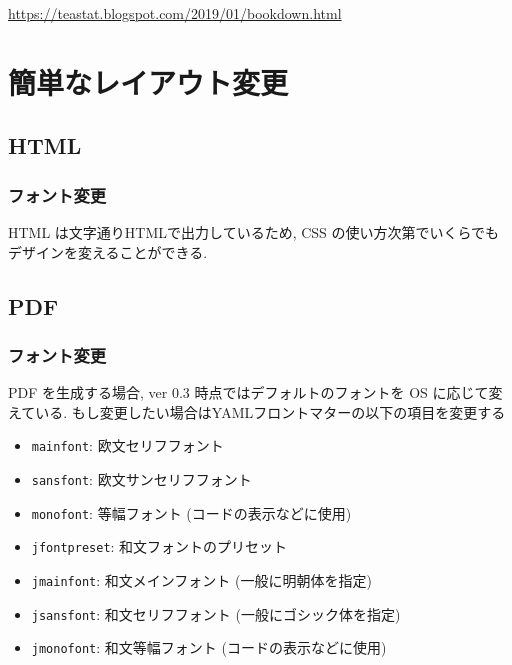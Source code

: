 \documentclass[
  nomag]{bxjsbook}
\providecommand{\tightlist}{%
  \setlength{\itemsep}{0pt}\setlength{\parskip}{0pt}}
\theoremstyle{definition}
\theoremstyle{definition}
\theoremstyle{definition}
\theoremstyle{remark}
\begin{document}
\url{https://teastat.blogspot.com/2019/01/bookdown.html}

\hypertarget{ux7c21ux5358ux306aux30ecux30a4ux30a2ux30a6ux30c8ux5909ux66f4}{%
\chapter{簡単なレイアウト変更}\label{ux7c21ux5358ux306aux30ecux30a4ux30a2ux30a6ux30c8ux5909ux66f4}}

\hypertarget{html}{%
\section{HTML}\label{html}}

\hypertarget{ux30d5ux30a9ux30f3ux30c8ux5909ux66f4}{%
\subsection{フォント変更}\label{ux30d5ux30a9ux30f3ux30c8ux5909ux66f4}}

HTML は文字通りHTMLで出力しているため, CSS
の使い方次第でいくらでもデザインを変えることができる.

\hypertarget{pdf}{%
\section{PDF}\label{pdf}}

\hypertarget{ux30d5ux30a9ux30f3ux30c8ux5909ux66f4-1}{%
\subsection{フォント変更}\label{ux30d5ux30a9ux30f3ux30c8ux5909ux66f4-1}}

PDF を生成する場合, ver 0.3 時点ではデフォルトのフォントを OS
に応じて変えている.
もし変更したい場合はYAMLフロントマターの以下の項目を変更する

\begin{itemize}
\tightlist
\item
  \texttt{mainfont}: 欧文セリフフォント
\item
  \texttt{sansfont}: 欧文サンセリフフォント
\item
  \texttt{monofont}: 等幅フォント (コードの表示などに使用)
\item
  \texttt{jfontpreset}: 和文フォントのプリセット
\item
  \texttt{jmainfont}: 和文メインフォント (一般に明朝体を指定)
\item
  \texttt{jsansfont}: 和文セリフフォント (一般にゴシック体を指定)
\item
  \texttt{jmonofont}: 和文等幅フォント (コードの表示などに使用)
\end{itemize}
\end{document}
